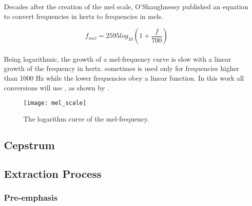 Decades after the creation of the mel scale, O'Shaughnessy \cite{oshaughnessy.1987}
published an equation to convert frequencies in hertz to frequencies in mels.

\begin{equation}
    f_{mel} = 2595 log_{10}(1 + \frac{f}{700})
    \label{eq:mel_conversion}
\end{equation}
\\
\noindent Being logarithmic, the growth of a mel-frequency curve is slow with a
linear growth of the frequency in hertz.  sometimes
is used only for frequencies higher than 1000 Hz while the lower frequencies obey
a linear function. In this work all conversions will use ,
as shown by .

\begin{figure}[ht]
    \centering
    \texttt{[image: mel\_scale]}
    \caption{The logarithm curve of the mel-frequency.}
    \label{fig:mel_scale}
\end{figure}


\subsection{Cepstrum}


\subsection{Extraction Process}


\subsubsection{Pre-emphasis}